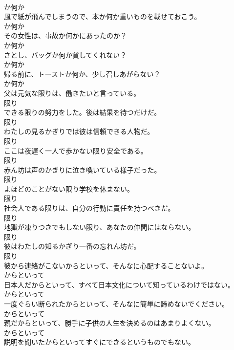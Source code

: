\documentclass[8pt]{extreport}
\begin{document}
\begin{CJK}{UTF8}{min}
\\	か何か
\\	風で紙が飛んでしまうので、本か何か重いものを載せておこう。	
\\	か何か
\\	その女性は、事故か何かにあったのか？	
\\	か何か
\\	さとし、バッグか何か貸してくれない？	
\\	か何か
\\	帰る前に、トーストか何か、少し召しあがらない？	
\\	か何か
\\	父は元気な限りは、働きたいと言っている。	
\\	限り
\\	できる限りの努力をした。後は結果を待つだけだ。	
\\	限り
\\	わたしの見るかぎりでは彼は信頼できる人物だ。	
\\	限り
\\	ここは夜遅く一人で歩かない限り安全である。	
\\	限り
\\	赤ん坊は声のかぎりに泣き喚いている様子だった。	
\\	限り
\\	よほどのことがない限り学校を休まない。	
\\	限り
\\	社会人である限りは、自分の行動に責任を持つべきだ。	
\\	限り
\\	地獄が凍りつきでもしない限り、あなたの仲間にはならない。	
\\	限り
\\	彼はわたしの知るかぎり一番の忘れん坊だ。	
\\	限り
\\	彼から連絡がこないからといって、そんなに心配することないよ。	
\\	からといって
\\	日本人だからといって、すべて日本文化について知っているわけではない。	
\\	からといって
\\	一度ぐらい断られたからといって、そんなに簡単に諦めないでください。	
\\	からといって
\\	親だからといって、勝手に子供の人生を決めるのはあまりよくない。	
\\	からといって
\\	説明を聞いたからといってすぐにできるというものでもない。	

\end{CJK}
\end{document}
